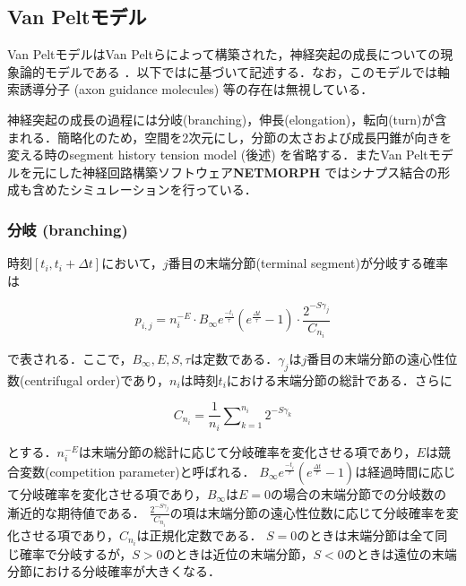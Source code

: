 \subsection{Van Peltモデル}
Van PeltモデルはVan Peltらによって構築された，神経突起の成長についての現象論的モデルである \cite{Van_Pelt2002-vm}．以下では\cite{Koene2009-hv}に基づいて記述する．なお，このモデルでは軸索誘導分子 (axon guidance molecules) 等の存在は無視している．

神経突起の成長の過程には分岐(branching)，伸長(elongation)，転向(turn)が含まれる．簡略化のため，空間を2次元にし，分節の太さおよび成長円錐が向きを変える時のsegment history tension model (後述) を省略する．またVan Peltモデルを元にした神経回路構築ソフトウェア\textbf{NETMORPH} \cite{Koene2009-hv}ではシナプス結合の形成も含めたシミュレーションを行っている．

\subsubsection{分岐 (branching)}
時刻$[t_i, t_i + \Delta t]$において，$j$番目の末端分節(terminal segment)が分岐する確率は


\begin{equation}
p_{i,j} = n_i^{-E}\cdot B_{\infty} e^{\frac{-t_i}{\tau}} \left(e^{\frac{\Delta t}{\tau}} - 1\right)\cdot \frac{2^{-S\gamma_j}}{C_{n_i}}
\end{equation}


で表される．ここで，$B_{\infty}, E, S, \tau$は定数である．$\gamma_j$は$j$番目の末端分節の遠心性位数(centrifugal order)であり，$n_i$は時刻$t_i$における末端分節の総計である．さらに


\begin{equation}
{C_{n_i}} = \frac{1}{n_i}\sum\nolimits_{k = 1}^{n_i} {{2^{ - S{\gamma_k}}}}
\end{equation}


とする．$n_i^{-E}$は末端分節の総計に応じて分岐確率を変化させる項であり，$E$は競合変数(competition parameter)と呼ばれる．
$B_{\infty} e^{\frac{-t_i}{\tau}} \left(e^{\frac{\Delta t}{\tau}} - 1\right)$は経過時間に応じて分岐確率を変化させる項であり，$B_{\infty}$は$E=0$の場合の末端分節での分岐数の漸近的な期待値である．
$\frac{2^{-S\gamma_j}}{C_{n_i}}$の項は末端分節の遠心性位数に応じて分岐確率を変化させる項であり，$C_{n_i}$は正規化定数である．
$S=0$のときは末端分節は全て同じ確率で分岐するが，$S>0$のときは近位の末端分節，$S<0$のときは遠位の末端分節における分岐確率が大きくなる．

